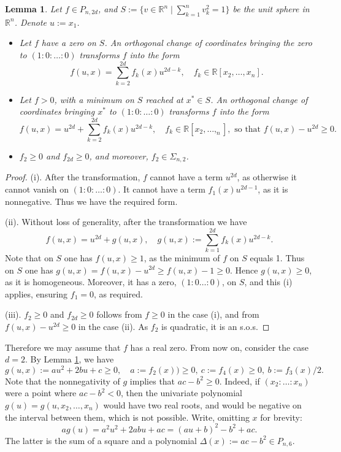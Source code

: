 \documentclass[a4paper,twoside,reqno]{amsart}
\newcommand{\RR}{\mathbb{R}}
\newcommand{\PHF}[2]{P_{{#2},{#1}}}
\newcommand{\SosHF}[2]{\Sigma_{{#2},{#1}}}
\theoremstyle{plain}
\newtheorem{lem}[prop]{Lemma}
\theoremstyle{definition}
\theoremstyle{remark}
\begin{document}
\begin{lem}\label{lem1}
Let $f\in\PHF{2d}{n}$, 
and $S:=\{v\in \RR^{n}\mid \sum_{k=1}^n v_k^2=1\}$ be the unit sphere in $\RR^{n}$. Denote $u:=x_1$.
\begin{itemize}
\item[(i)] Let $f$ have a zero on $S$.  An orthogonal change
of coordinates bringing the zero to $(1{:}0{:}\dots {:} 0)$ transforms $f$ into the form
\begin{equation}
f(u,x)=\sum_{k=2}^{2d} f_k(x) u^{2d-k}, \quad f_k\in\RR[x_2,\dots,x_n].\label{red0}
\end{equation}
\item[(ii)] Let $f>0$, with a  minimum on $S$
reached at $x^*\in S$. 
An orthogonal change of coordinates bringing $x^*$ to $(1{:}0{:}\dots {:}0)$ transforms $f$ into the form
\begin{equation}
    f(u,x)=u^{2d}+\sum_{k=2}^{2d} f_k(x) u^{2d-k}, \quad f_k\in\RR[x_2,\dots,_n],\text{ so that $f(u,x)-u^{2d}\geq 0$.}\label{rednon0}
\end{equation}
\item[(iii)] $f_2\geq 0$ and $f_{2d}\geq 0$, and moreover, $f_2\in \SosHF{2}{n}$.
\end{itemize}
\end{lem}

\begin{proof}
(i). After the transformation, $f$ cannot have a term $u^{2d}$, as otherwise
it cannot vanish on $(1{:}0{:}\dots {:}0)$. It cannot have a term $f_1(x)u^{2d-1}$, as 
it is nonnegative. Thus we have the required form.

(ii).  Without loss of generality, after the transformation we have
\[
f(u,x)=u^{2d}+g(u,x), \quad g(u,x):=\sum_{k=1}^{2d} f_k(x) u^{2d-k}.
\]
Note that on $S$ one has $f(u,x)\geq 1$, as the minimum of $f$ on $S$ equals 1.
Thus on $S$ one has $g(u,x)=f(u,x)-u^{2d}\geq f(u,x)-1\geq 0$. Hence $g(u,x)\geq 0$,
as it is homogeneous. Moreover, it has a zero, $(1{:}0\dots {:}0)$, on 
$S$, and this (i) applies, ensuring $f_1=0$, as required.

(iii). $f_2\geq 0$ and $f_{2d}\geq 0$ follows from $f\geq 0$ in the case (i), and
from $f(u,x)-u^{2d}\geq 0$ in the case (ii). As $f_2$ is quadratic, it is an s.o.s.
\end{proof}

Therefore we may assume that $f$ has a real zero.
From now on, consider the case $d=2$. By Lemma \ref{lem1}, we have
\[ g(u,x):=au^2+2bu+c\geq 0,\quad a:=f_2(x))\geq 0,\ c:=f_4(x)\geq 0,\ b:=f_3(x)/2.\]
Note that the nonnegativity of $g$ implies that $ac -b^2\geq 0$.
Indeed, if $(x_2{:}\dots {:}x_n)$ were a point where $ac -b^2<0$, then the univariate
polynomial $g(u)=g(u,x_2,\dots,x_n)$ would have two real roots,
and would be negative on the interval between them, which is not possible.
Write, omitting $x$ for brevity:
\begin{equation}
ag(u)=a^2u^2+2abu+ac= (au+b)^2-b^2+ac. \label{abcsq}
\end{equation}
The latter is the sum of a square and a
polynomial $\Delta(x):=ac-b^2\in\PHF{6}{n}$.
\end{document}
